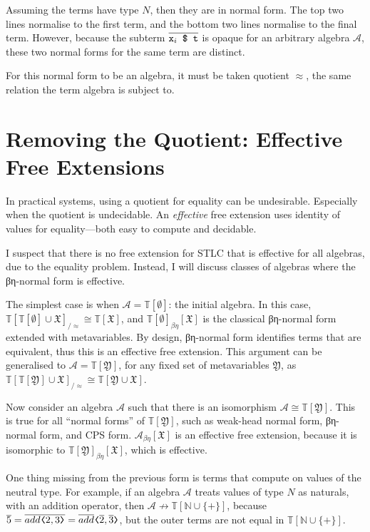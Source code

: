 \documentclass[11pt,a4paper]{article}
\newcommand*\Litt[1]{\texttt{#1}}
\newcommand*\Var[1]{\Litt{x}_{#1}}
\newcommand*\Lapp[2]{\texttt{\ensuremath{#1} \$ \ensuremath{#2}}}
\newcommand*\mvar[2]{\texttt{\ensuremath{#1}⟨\ensuremath{#2}⟩}}
\newcommand*\term[1]{\ensuremath{\mathbb{T}{[{#1}]}}}
\newcommand*\sta[1]{\mathop{\overline{#1}}}
\begin{document}
Assuming the terms have type \(N\), then they are in normal form. The top two
lines normalise to the first term, and the bottom two lines normalise to the
final term. However, because the subterm \(\sta{\Lapp{\Var{i}}{\Litt{t}}}\) is
opaque for an arbitrary algebra \(\mathcal{A}\), these two normal forms for the same term
are distinct.

For this normal form to be an algebra, it must be taken quotient \(\approx\), the same
relation the term algebra is subject to.

\section{Removing the Quotient: Effective Free Extensions}

In practical systems, using a quotient for equality can be undesirable.
Especially when the quotient is undecidable. An \emph{effective} free extension
uses identity of values for equality---both easy to compute and decidable.

I suspect that there is no free extension for STLC that is effective for all
algebras, due to the equality problem. Instead, I will discuss classes of
algebras where the βη-normal form is effective.

The simplest case is when \(\mathcal{A} = \term{\emptyset}\): the initial algebra. In this case,
\(\term{\term{\emptyset} \cup \mathfrak{X}}_{/\approx} \cong \term{\mathfrak{X}}\), and \(\term{\emptyset}_{\beta\eta}[\mathfrak{X}]\) is the
classical βη-normal form extended with metavariables. By design, βη-normal form
identifies terms that are equivalent, thus this is an effective free extension.
This argument can be generalised to \(\mathcal{A} = \term{\mathfrak{Y}}\), for any fixed set of
metavariables \(\mathfrak{Y}\), as \(\term{\term{\mathfrak{Y}} \cup \mathfrak{X}}_{/\approx} \cong \term{\mathfrak{Y} \cup \mathfrak{X}}\).

Now consider an algebra \(\mathcal{A}\) such that there is an isomorphism \(\mathcal{A}\cong\term{\mathfrak{Y}}\).
This is true for all ``normal forms'' of \term{\mathfrak{Y}}, such as weak-head normal
form, βη-normal form, and CPS form. \(\mathcal{A}_{\beta\eta}[\mathfrak{X}]\) is an effective free
extension, because it is isomorphic to \(\term{\mathfrak{Y}}_{\beta\eta}[\mathfrak{X}]\), which is effective.

One thing missing from the previous form is terms that compute on values of the
neutral type. For example, if an algebra \(\mathcal{A}\) treats values of type \(N\) as
naturals, with an addition operator, then \(\mathcal{A}\not\to\term{\mathbb{N}\cup\{+\}}\), because
\(\sta{5} = \sta{\mvar{add}{2, 3}} = \mvar{\sta{add}}{\sta{2}, \sta{3}}\), but
the outer terms are not equal in \term{\mathbb{N}\cup\{+\}}.
\end{document}

